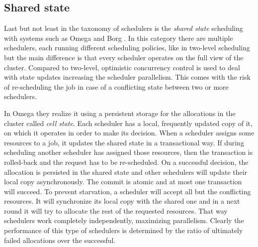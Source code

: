 \subsection{Shared state}
\label{ssec:tax_shared_state}
Last but not least in the taxonomy of schedulers is the \emph{shared
state} scheduling with systems such as Omega \cite{41684} and Borg
\cite{43438}. In this category there are multiple schedulers, each
running different scheduling policies, like in two-level scheduling but
the main difference is that every scheduler operates on the full view of
the cluster. Compared to two-level, optimistic concurrency control is
used to deal with state updates increasing the scheduler
parallelism. This comes with the risk of re-scheduling the job in case
of a conflicting state between two or more schedulers.

In Omega they realize it using a persistent storage for the
allocations in the cluster called \emph{cell state}. Each scheduler
has a local, frequently updated copy of it, on which it operates in
order to make its decision. When a scheduler assigns some resources to
a job, it updates the shared state in a transactional way. If during scheduling
another scheduler has assigned those resources, then the
transaction is rolled-back and the request has to be re-scheduled. On a
successful decision, the allocation is persisted in the shared state
and other schedulers will update their local copy asynchronously. The
commit is atomic and at most one transaction will succeed. To
prevent starvation, a scheduler will accept all but the conflicting
resources. It will synchronize its local copy with the shared one and
in a next round it will try to allocate the rest of the requested
resources. That way schedulers work completely independently,
maximizing parallelism. Clearly the performance of this type of
schedulers is determined by the ratio of ultimately failed allocations
over the successful.
